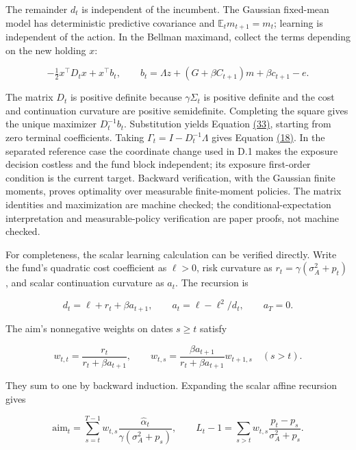 \documentclass[11pt]{article}
\begin{document}
The remainder \(d_t\) is independent of the incumbent. The Gaussian fixed-mean model has deterministic predictive covariance and \(\mathbb E_t m_{t+1}=m_t\); learning is independent of the action. In the Bellman maximand, collect the terms depending on the new holding \(x\):

\begin{equation*}
-\tfrac12x^\top D_tx+x^\top b_t,\qquad
b_t=\Lambda z+(G+\beta C_{t+1})m+\beta c_{t+1}-e.
\end{equation*}

The matrix \(D_t\) is positive definite because \(\gamma\Sigma_t\) is positive definite and the cost and continuation curvature are positive semidefinite. Completing the square gives the unique maximizer \(D_t^{-1}b_t\). Substitution yields Equation \hyperref[eq:33]{(33)}, starting from zero terminal coefficients. Taking \(\Gamma_t=I-D_t^{-1}\Lambda\) gives Equation \hyperref[eq:18]{(18)}. In the separated reference case the coordinate change used in D.1 makes the exposure decision costless and the fund block independent; its exposure first-order condition is the current target. Backward verification, with the Gaussian finite moments, proves optimality over measurable finite-moment policies. The matrix identities and maximization are machine checked; the conditional-expectation interpretation and measurable-policy verification are paper proofs, not machine checked.

For completeness, the scalar learning calculation can be verified directly. Write the fund's quadratic cost coefficient as \(\ell>0\), risk curvature as \(r_t=\gamma(\sigma_A^2+p_t)\), and scalar continuation curvature as \(a_t\). The recursion is

\begin{equation*}
d_t=\ell+r_t+\beta a_{t+1},\qquad
a_t=\ell-\ell^2/d_t,\qquad a_T=0.
\end{equation*}

The aim's nonnegative weights on dates \(s\geq t\) satisfy

\begin{equation*}
w_{t,t}=\frac{r_t}{r_t+\beta a_{t+1}},\qquad
w_{t,s}=\frac{\beta a_{t+1}}{r_t+\beta a_{t+1}}w_{t+1,s}\quad(s>t).
\end{equation*}

They sum to one by backward induction. Expanding the scalar affine recursion gives

\begin{equation*}
\mathrm{aim}_t=\sum_{s=t}^{T-1}w_{t,s}
\frac{\hat\alpha_t}{\gamma(\sigma_A^2+p_s)},\qquad
L_t-1=\sum_{s>t}w_{t,s}\frac{p_t-p_s}{\sigma_A^2+p_s}.
\end{equation*}
\end{document}
